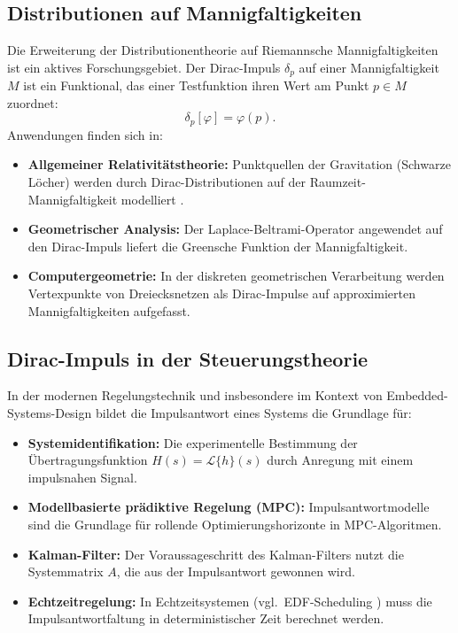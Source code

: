 ﻿\documentclass[a4paper,12pt]{article}
\theoremstyle{definition}
\begin{document}
\subsection{Distributionen auf Mannigfaltigkeiten}

Die Erweiterung der Distributionentheorie auf Riemannsche Mannigfaltigkeiten
\cite{hormander2003analysis} ist ein aktives Forschungsgebiet. Der Dirac-Impuls
$\delta_p$ auf einer Mannigfaltigkeit $M$ ist ein Funktional, das einer Testfunktion
ihren Wert am Punkt $p \in M$ zuordnet:
\[
\delta_p[\varphi] = \varphi(p).
\]
Anwendungen finden sich in:
\begin{itemize}
    \item \textbf{Allgemeiner Relativit\"atstheorie:} Punktquellen der Gravitation
          (Schwarze L\"ocher) werden durch Dirac-Distributionen auf der Raumzeit-Mannigfaltigkeit
          modelliert \cite{geroch1987}.
    \item \textbf{Geometrischer Analysis:} Der Laplace-Beltrami-Operator angewendet auf
          den Dirac-Impuls liefert die Greensche Funktion der Mannigfaltigkeit.
    \item \textbf{Computergeometrie:} In der diskreten geometrischen Verarbeitung werden
          Vertexpunkte von Dreiecksnetzen als Dirac-Impulse auf approximierten Mannigfaltigkeiten
          aufgefasst.
\end{itemize}

\subsection{Dirac-Impuls in der Steuerungstheorie}

In der modernen Regelungstechnik \cite{lunze2014regelungstechnik} und insbesondere
im Kontext von Embedded-Systems-Design \cite{epp2026embedded} bildet die Impulsantwort
eines Systems die Grundlage f\"ur:
\begin{itemize}
    \item \textbf{Systemidentifikation:} Die experimentelle Bestimmung der \"Ubertragungsfunktion
          $H(s) = \mathcal{L}\{h\}(s)$ durch Anregung mit einem impulsnahen Signal.
    \item \textbf{Modellbasierte pr\"adiktive Regelung (MPC):} Impulsantwortmodelle sind
          die Grundlage f\"ur rollende Optimierungshorizonte in MPC-Algoritmen.
    \item \textbf{Kalman-Filter:} Der Voraussageschritt des Kalman-Filters nutzt die
          Systemmatrix $A$, die aus der Impulsantwort gewonnen wird.
    \item \textbf{Echtzeitregelung:} In Echtzeitsystemen (vgl.\ EDF-Scheduling
          \cite{epp2026edf}) muss die Impulsantwortfaltung in deterministischer Zeit
          berechnet werden.
\end{itemize}
\end{document}

